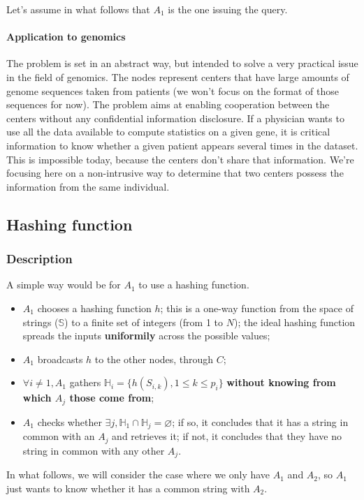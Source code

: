 \documentclass[usletter,11pt,final]{article}
\begin{document}
Let's assume in what follows that $A_1$ is the one issuing the query.

\paragraph{Application to genomics} The problem is set in an abstract way, but intended to solve a very practical issue in the field of genomics. The nodes represent centers that have large amounts of genome sequences taken from patients (we won't focus on the format of those sequences for now). The problem aims at enabling cooperation between the centers without any confidential information disclosure. If a physician wants to use all the data available to compute statistics on a given gene, it is critical information to know whether a given patient appears several times in the dataset. This is impossible today, because the centers don't share that information. We're focusing here on a non-intrusive way to determine that two centers possess the information from the same individual.

\subsection{Hashing function}
\subsubsection{Description}
A simple way would be for $A_1$ to use a hashing function.
\begin{itemize}
\item $A_1$ chooses a hashing function $h$; this is a one-way function from the space of strings ($\mathbb{S}$) to a finite set of integers (from 1 to $N$); the ideal hashing function spreads the inputs \textbf{uniformily} across the possible values;
\item $A_1$ broadcasts $h$ to the other nodes, through $C$;
\item $\forall i \ne 1, A_1$ gathers $\mathbb{H}_i =  \{h(S_{i,k}), 1 \le k \le p_i\}$ \textbf{without knowing from which $A_j$ those come from};
\item $A_1$ checks whether $\exists j, \mathbb{H}_1 \cap \mathbb{H}_j = \varnothing$; if so, it concludes that it has a string in common with an $A_j$ and retrieves it; if not, it concludes that they have no string in common with any other $A_j$.
\end{itemize}

In what follows, we will consider the case where we only have $A_1$ and $A_2$, so $A_1$ just wants to know whether it has a common string with $A_2$.
\end{document}

